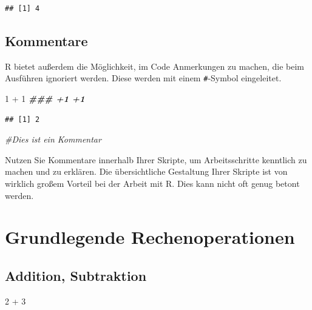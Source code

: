 \documentclass[
]{book}
\newenvironment{Shaded}{\begin{snugshade}}{\end{snugshade}}
\newcommand{\CommentTok}[1]{\textcolor[rgb]{0.56,0.35,0.01}{\textit{#1}}}
\newcommand{\DecValTok}[1]{\textcolor[rgb]{0.00,0.00,0.81}{#1}}
\newcommand{\DocumentationTok}[1]{\textcolor[rgb]{0.56,0.35,0.01}{\textbf{\textit{#1}}}}
\newcommand{\SpecialCharTok}[1]{\textcolor[rgb]{0.00,0.00,0.00}{#1}}
\begin{document}
\begin{verbatim}
## [1] 4
\end{verbatim}

\hypertarget{kommentare}{%
\subsection*{Kommentare}\label{kommentare}}

R bietet außerdem die Möglichkeit, im Code Anmerkungen zu machen, die beim Ausführen ignoriert werden. Diese werden mit einem \texttt{\#}-Symbol eingeleitet.

\begin{Shaded}
\begin{Highlighting}[]
\DecValTok{1} \SpecialCharTok{+} \DecValTok{1} \DocumentationTok{\#\#\# +1 +1}
\end{Highlighting}
\end{Shaded}

\begin{verbatim}
## [1] 2
\end{verbatim}

\begin{Shaded}
\begin{Highlighting}[]
\CommentTok{\#Dies ist ein Kommentar}
\end{Highlighting}
\end{Shaded}

Nutzen Sie Kommentare innerhalb Ihrer Skripte, um Arbeitsschritte kenntlich zu machen und zu erklären. Die übersichtliche Gestaltung Ihrer Skripte ist von wirklich großem Vorteil bei der Arbeit mit R. Dies kann nicht oft genug betont werden.

\hypertarget{grundlegende-rechenoperationen}{%
\section{Grundlegende Rechenoperationen}\label{grundlegende-rechenoperationen}}

\hypertarget{addition-subtraktion}{%
\subsection*{Addition, Subtraktion}\label{addition-subtraktion}}

\begin{Shaded}
\begin{Highlighting}[]
\DecValTok{2} \SpecialCharTok{+} \DecValTok{3}  
\end{Highlighting}
\end{Shaded}
\end{document}
